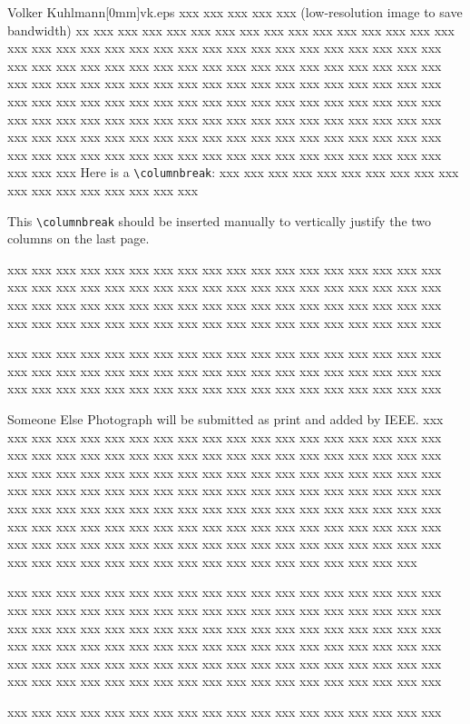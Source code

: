 \documentclass[10pt,twoside%
	]{article}
\begin{document}
\begin{biography}{Volker Kuhlmann}[0mm]{vk.eps}
xxx xxx xxx xxx xxx\linebreak
(low-resolution image to save bandwidth) xx
xxx xxx xxx xxx xxx xxx xxx xxx xxx xxx xxx xxx xxx xxx xxx xxx xxx xxx 
xxx xxx xxx xxx xxx xxx xxx xxx xxx xxx xxx xxx xxx xxx xxx xxx xxx xxx 
xxx xxx xxx xxx xxx xxx xxx xxx xxx xxx xxx xxx xxx xxx xxx xxx xxx xxx 
xxx xxx xxx xxx xxx xxx xxx xxx xxx xxx xxx xxx xxx xxx xxx xxx xxx xxx 
xxx xxx xxx xxx xxx xxx xxx xxx xxx xxx xxx xxx xxx xxx xxx xxx xxx xxx 
xxx xxx xxx xxx xxx xxx xxx xxx xxx xxx xxx xxx xxx xxx xxx xxx xxx xxx 
xxx xxx xxx xxx xxx xxx xxx xxx xxx xxx xxx xxx xxx xxx xxx xxx xxx xxx 
xxx xxx xxx xxx xxx xxx xxx xxx xxx xxx xxx xxx xxx xxx xxx xxx xxx xxx 
Here is a \verb+\columnbreak+:
\columnbreak
xxx xxx xxx xxx xxx xxx xxx xxx xxx xxx xxx xxx xxx xxx xxx xxx xxx xxx 

This \verb+\columnbreak+ should be inserted manually to vertically
justify the two columns on the last page.

xxx xxx xxx xxx xxx xxx xxx xxx xxx xxx xxx xxx xxx xxx xxx xxx xxx xxx 
xxx xxx xxx xxx xxx xxx xxx xxx xxx xxx xxx xxx xxx xxx xxx xxx xxx xxx 
xxx xxx xxx xxx xxx xxx xxx xxx xxx xxx xxx xxx xxx xxx xxx xxx xxx xxx 
xxx xxx xxx xxx xxx xxx xxx xxx xxx xxx xxx xxx xxx xxx xxx xxx xxx xxx 

xxx xxx xxx xxx xxx xxx xxx xxx xxx xxx xxx xxx xxx xxx xxx xxx xxx xxx 
xxx xxx xxx xxx xxx xxx xxx xxx xxx xxx xxx xxx xxx xxx xxx xxx xxx xxx 
xxx xxx xxx xxx xxx xxx xxx xxx xxx xxx xxx xxx xxx xxx xxx xxx xxx xxx 
\end{biography}



\begin{biography}{Someone Else}{}
Photograph will be submitted as print and added by IEEE.
xxx xxx xxx xxx xxx xxx xxx xxx xxx xxx xxx xxx xxx xxx xxx xxx xxx xxx 
xxx xxx xxx xxx xxx xxx xxx xxx xxx xxx xxx xxx xxx xxx xxx xxx xxx xxx 
xxx xxx xxx xxx xxx xxx xxx xxx xxx xxx xxx xxx xxx xxx xxx xxx xxx xxx 
xxx xxx xxx xxx xxx xxx xxx xxx xxx xxx xxx xxx xxx xxx xxx xxx xxx xxx 
xxx xxx xxx xxx xxx xxx xxx xxx xxx xxx xxx xxx xxx xxx xxx xxx xxx xxx 
xxx xxx xxx xxx xxx xxx xxx xxx xxx xxx xxx xxx xxx xxx xxx xxx xxx xxx 
xxx xxx xxx xxx xxx xxx xxx xxx xxx xxx xxx xxx xxx xxx xxx xxx xxx xxx 
xxx xxx xxx xxx xxx xxx xxx xxx xxx xxx xxx xxx xxx xxx xxx xxx xxx xxx 

xxx xxx xxx xxx xxx xxx xxx xxx xxx xxx xxx xxx xxx xxx xxx xxx xxx xxx 
xxx xxx xxx xxx xxx xxx xxx xxx xxx xxx xxx xxx xxx xxx xxx xxx xxx xxx 
xxx xxx xxx xxx xxx xxx xxx xxx xxx xxx xxx xxx xxx xxx xxx xxx xxx xxx 
xxx xxx xxx xxx xxx xxx xxx xxx xxx xxx xxx xxx xxx xxx xxx xxx xxx xxx 
xxx xxx xxx xxx xxx xxx xxx xxx xxx xxx xxx xxx xxx xxx xxx xxx xxx xxx 
xxx xxx xxx xxx xxx xxx xxx xxx xxx xxx xxx xxx xxx xxx xxx xxx xxx xxx 

xxx xxx xxx xxx xxx xxx xxx xxx xxx xxx xxx xxx xxx xxx xxx xxx xxx xxx 
\end{biography}
\end{document}
